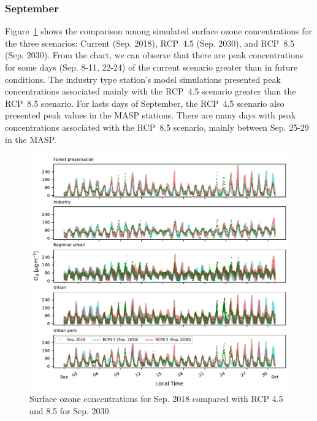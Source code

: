 \subsubsection{September}
Figure~\ref{fig:o3_changes} shows the comparison among simulated surface ozone concentrations for the three scenarios: Current (Sep. 2018), RCP~4.5 (Sep. 2030), and RCP~8.5 (Sep. 2030).
From the chart, we can observe that there are peak concentrations for some days (Sep. 8-11, 22-24) of the current scenario greater than in future conditions.
The industry type station's model simulations presented peak concentrations associated mainly with the RCP~4.5 scenario greater than the RCP~8.5 scenario.
For lasts days of September, the RCP~4.5 scenario also presented peak values in the MASP stations.
There are many days with peak concentrations associated with the RCP~8.5 scenario, mainly between Sep. 25-29 in the MASP.

\begin{figure}[!hbt]
\begin{center}
  \includegraphics[width=1.05\textwidth]{fig/rcp_2030_subplot_o3}
\end{center}
  \caption{Surface ozone concentrations for Sep. 2018 compared with RCP 4.5 and 8.5 for Sep. 2030.}
  \label{fig:o3_changes}
\end{figure}

